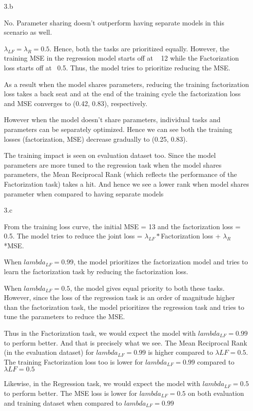 \clearpage

\LARGE
3.b
\normalsize

\begin{answer}
No. Parameter sharing doesn't outperform having separate models in this scenario as well. 

$\lambda_{LF} = \lambda_{R} = 0.5$. Hence, both the tasks are prioritized equally. However, the training MSE in the regression model starts off at ~ 12 while the Factorization loss starts off at ~0.5. Thus, the model tries to prioritize reducing the MSE. 

As a result when the model shares parameters, reducing the training factorization loss takes a back seat and at the end of the training cycle the factorization loss and MSE converges to (0.42, 0.83), respectively. 

However when the model doesn't share parameters, individual tasks and parameters can be separately optimized. Hence we can see both the training losses (factorization, MSE) decrease gradually to (0.25, 0.83). 

The training impact is seen on evaluation dataset too. Since the model parameters are more tuned to the regression task when the model shares parameters, the Mean Reciprocal Rank (which reflects the performance of the Factorization task) takes a hit. And hence we see a lower rank when model shares parameter when compared to having separate models

\end{answer}

\clearpage

\LARGE
3.c
\normalsize

\begin{answer}
From the training loss curve, the initial MSE = 13 and the factorization loss = 0.5. The model tries to reduce the joint loss = $\lambda_{LF}*$Factorization loss + $\lambda_R$*MSE. 

When $lambda_{LF} = 0.99$, the model prioritizes the factorization model and tries to learn the factorization task by reducing the factorization loss. 

When $lambda_{LF} = 0.5$, the model gives equal priority to both these tasks. However, since the loss of the regression task is an order of magnitude higher than the factorization task, the model prioritizes the regression task and tries to tune the parameters to reduce the MSE.

Thus in the Factorization task, we would expect the model with $lambda_{LF}=0.99$ to perform better. And that is precisely what we see. The Mean Reciprocal Rank (in the evaluation dataset) for $lambda_{LF}=0.99$ is higher compared to $\lambda{LF}=0.5$. The training Factorization loss too is lower for $lambda_{LF}=0.99$ compared to $\lambda{LF}=0.5$

Likewise, in the Regression task, we would expect the model with $lambda_{LF}=0.5$ to perform better. The MSE loss is lower for $lambda_{LF}=0.5$ on both evaluation and training dataset when compared to $lambda_{LF}=0.99$ 


\end{answer}


